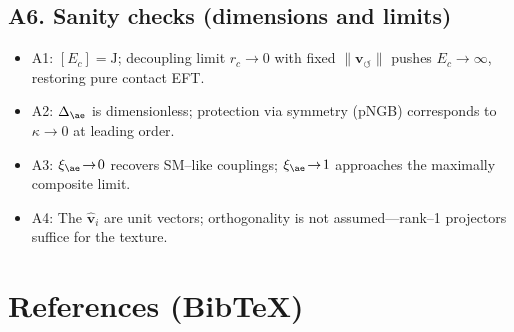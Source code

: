 \documentclass[11pt]{article}
\begin{document}
  \subsection*{A6. Sanity checks (dimensions and limits)}
  \begin{itemize}
  \item A1: $[E_c]=\mathrm{J}$; decoupling limit $r_c\!\to\!0$ with fixed $\|\mathbf v_{\!\circlearrowleft}\|$ pushes $E_c\!\to\!\infty$, restoring pure contact EFT.
  \item A2: $\Delta_{\ae}$ is dimensionless; protection via symmetry (pNGB) corresponds to $\kappa\!\to\!0$ at leading order.
  \item A3: $\xi_{\ae}\!\to\!0$ recovers SM–like couplings; $\xi_{\ae}\!\to\!1$ approaches the maximally composite limit.
  \item A4: The $\hat{\mathbf v}_i$ are unit vectors; orthogonality is not assumed—rank–1 projectors suffice for the texture.
  \end{itemize}

  \section*{References (Bib\TeX)}
  \begin{verbatim}

  \end{verbatim}



  \ifdefined\standalonechapter\else
  
\end{document}
